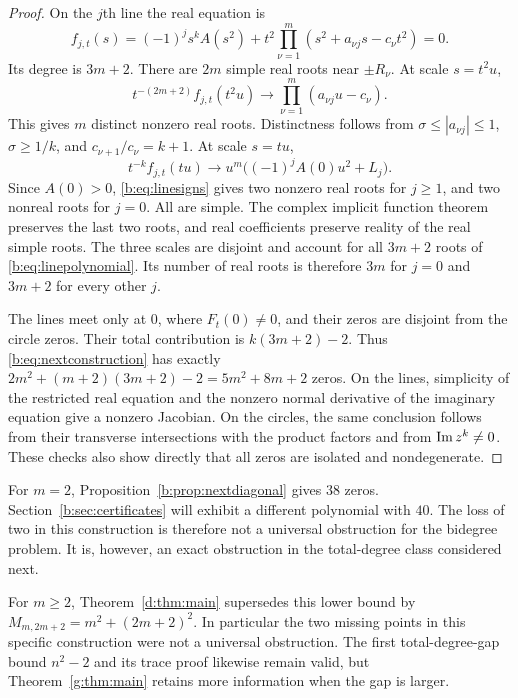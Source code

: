\documentclass[UTF8,11pt]{ctexart}
\theoremstyle{definition}
\numberwithin{equation}{section}
\begin{document}
\begin{proof}
On the $j$th line the real equation is
\begin{equation}\label{b:eq:linepolynomial}
 f_{j,t}(s)=(-1)^j s^kA(s^2)+t^2
       \prod_{\nu=1}^m(s^2+a_{\nu j}s-c_\nu t^2)=0.
\end{equation}
Its degree is $3m+2$. There are $2m$ simple real roots near
$\pm R_\nu$. At scale $s=t^2u$,
\[
 t^{-(2m+2)}f_{j,t}(t^2u)\longrightarrow
                  \prod_{\nu=1}^m(a_{\nu j}u-c_\nu).
\]
This gives $m$ distinct nonzero real roots. Distinctness follows
from $\sigma\le|a_{\nu j}|\le1$, $\sigma\ge1/k$, and
$c_{\nu+1}/c_\nu=k+1$.
At scale $s=tu$,
\[
 t^{-k}f_{j,t}(tu)\longrightarrow
             u^m\bigl((-1)^jA(0)u^2+L_j\bigr).
\]
Since $A(0)>0$, \eqref{b:eq:linesigns} gives two nonzero real roots
for $j\ge1$, and two nonreal roots for $j=0$. All are simple.
The complex implicit function theorem preserves the last two roots,
and real coefficients preserve reality of the real simple roots.
The three scales are disjoint and account for all $3m+2$ roots of
\eqref{b:eq:linepolynomial}. Its number of real roots is therefore
$3m$ for $j=0$ and $3m+2$ for every other $j$.

The lines meet only at $0$, where $F_t(0)\ne0$, and their zeros
are disjoint from the circle zeros. Their total contribution is
$k(3m+2)-2$. Thus \eqref{b:eq:nextconstruction} has exactly
$2m^2+(m+2)(3m+2)-2=5m^2+8m+2$ zeros.
On the lines, simplicity of the restricted real equation and the
nonzero normal derivative of the imaginary equation give a nonzero
Jacobian. On the circles, the same conclusion follows from their
transverse intersections with the product factors and from
$\operatorname{Im} z^k\ne0$. These checks also show directly that all zeros
are isolated and nondegenerate.
\end{proof}

For $m=2$, Proposition~\ref{b:prop:nextdiagonal} gives $38$ zeros.
Section~\ref{b:sec:certificates} will exhibit a different polynomial
with $40$. The loss of two in this construction is therefore not
a universal obstruction for the bidegree problem. It is, however,
an exact obstruction in the total-degree class considered next.


For $m\ge2$, Theorem~\ref{d:thm:main} supersedes this lower bound by
$M_{m,2m+2}=m^2+(2m+2)^2$. In particular the two missing points in this
specific construction were not a universal obstruction. The first
total-degree-gap bound $n^2-2$ and its trace proof likewise remain valid,
but Theorem~\ref{g:thm:main} retains more information when the gap is larger.
\end{document}
